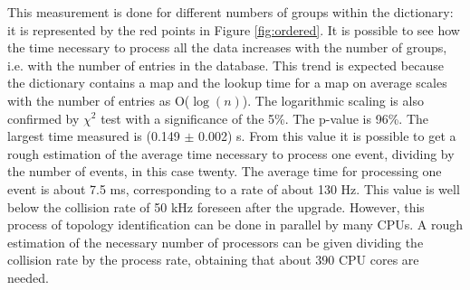 %
This measurement is done for different numbers of groups within the dictionary: it is represented by the red points in Figure \ref{fig:ordered}. It is possible to see how the time necessary to process all the data increases with the number of groups, i.e. with the number of entries in the database. This trend is expected because the dictionary contains a map and the lookup time for a map on average scales with the number of entries as O($\log(n)$). The logarithmic scaling is also confirmed by $\chi^2$ test with a significance of the 5\%. The p-value is 96\%. The largest time measured is (0.149 $\pm$ 0.002) s. From this value it is possible to get a rough estimation of the average time necessary to process one event, dividing by the number of events, in this case twenty. The average time for processing one event is about 7.5 ms, corresponding to a rate of about 130 Hz. This value is well below the collision rate of 50 kHz foreseen after the upgrade. However, this process of topology identification can be done in parallel by many CPUs. A rough estimation of the necessary number of processors can be given dividing the collision rate by the process rate, obtaining that about 390 CPU cores are needed. %
